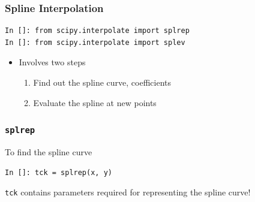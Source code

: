 \documentclass[14pt,compress]{beamer}
\newcommand{\typ}[1]{\lstinline{#1}}
\begin{document}


\begin{frame}[fragile]
\frametitle{Spline Interpolation}
\begin{small}
\begin{lstlisting}
In []: from scipy.interpolate import splrep
In []: from scipy.interpolate import splev
\end{lstlisting}
\end{small}
\begin{itemize}
\item Involves two steps
  \begin{enumerate}
  \item Find out the spline curve, coefficients
  \item Evaluate the spline at new points
  \end{enumerate}
\end{itemize}
\end{frame}

\begin{frame}[fragile]
\frametitle{\typ{splrep}}
To find the spline curve
\begin{lstlisting}
In []: tck = splrep(x, y)
\end{lstlisting}
\typ{tck} contains parameters required for representing the spline curve!
\end{frame}
\end{document}
